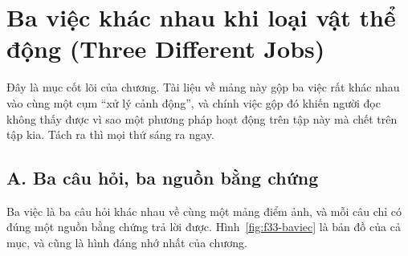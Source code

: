 \documentclass[../../deep_learning.tex]{subfiles}
\begin{document}
\section{Ba việc khác nhau khi loại vật thể động (Three Different Jobs)}
Đây là mục cốt lõi của chương. Tài liệu về mảng này gộp ba việc rất khác nhau vào cùng một cụm ``xử lý cảnh động'', và chính việc gộp đó khiến người đọc không thấy được vì sao một phương pháp hoạt động trên tập này mà chết trên tập kia. Tách ra thì mọi thứ sáng ra ngay.

\subsection{A. Ba câu hỏi, ba nguồn bằng chứng}
Ba việc là ba câu hỏi khác nhau về cùng một mảng điểm ảnh, và mỗi câu chỉ có đúng một nguồn bằng chứng trả lời được. Hình~\ref{fig:f33-baviec} là bản đồ của cả mục, và cũng là hình đáng nhớ nhất của chương.
\end{document}
